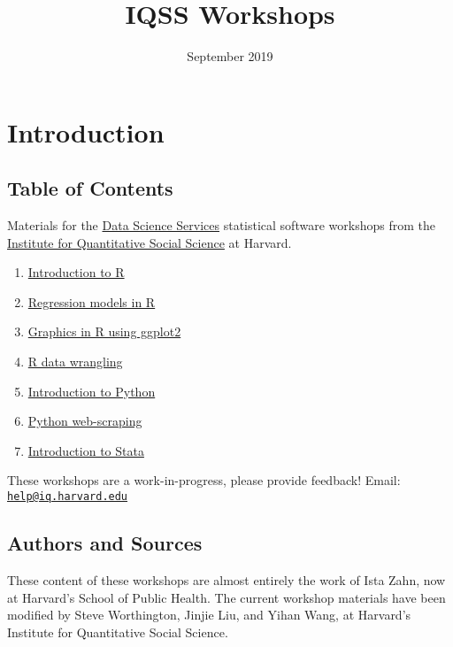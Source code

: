 \documentclass[]{book}
\title{IQSS Workshops}
\author{}
\date{September 2019}
\providecommand{\tightlist}{%
  \setlength{\itemsep}{0pt}\setlength{\parskip}{0pt}}
\begin{document}
\maketitle

{
\setcounter{tocdepth}{1}
\tableofcontents
}
\chapter*{Introduction}\label{introduction}

\section*{Table of Contents}\label{table-of-contents}

Materials for the \href{http://dss.iq.harvard.edu}{Data Science
Services} statistical software workshops from the
\href{http://iq.harvard.edu}{Institute for Quantitative Social Science}
at Harvard.

\begin{enumerate}
\def\labelenumi{\arabic{enumi}.}
\tightlist
\item
  \href{./R/Rintro/Rintro.html}{Introduction to R}
\item
  \href{./R/Rmodels/Rmodels.html}{Regression models in R}
\item
  \href{./R/Rgraphics/Rgraphics.html}{Graphics in R using ggplot2}
\item
  \href{./R/RDataWrangling/RDataWrangling.html}{R data wrangling}
\item
  \href{./Python/PythonIntro/PythonIntro.html}{Introduction to Python}
\item
  \href{./Python/PythonWebScrape/PythonWebScrape.html}{Python
  web-scraping}
\item
  \href{./Stata/StataIntro/StataIntro.html}{Introduction to Stata}
\end{enumerate}

These workshops are a work-in-progress, please provide feedback! Email:
\href{mailto:help@iq.harvard.edu}{\nolinkurl{help@iq.harvard.edu}}

\section*{Authors and Sources}\label{authors-and-sources}

These content of these workshops are almost entirely the work of Ista
Zahn, now at Harvard's School of Public Health. The current workshop
materials have been modified by Steve Worthington, Jinjie Liu, and Yihan
Wang, at Harvard's Institute for Quantitative Social Science.
\end{document}
